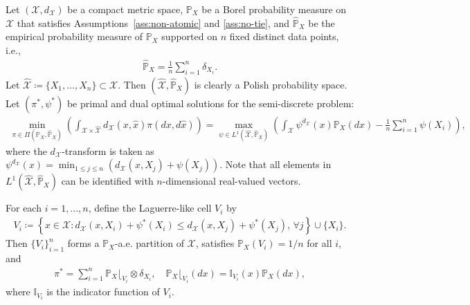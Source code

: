 \documentclass[10pt,a4paper]{amsart}
\begin{document}
\begin{lemma}
	\label{lem:laguerre}
	Let $(\mathcal{X},d_{\mathcal{X}})$ be a compact metric space, $\mathbb{P}_X$ be a Borel probability measure on $\mathcal{X}$ that satisfies Assumptions~\ref{ass:non-atomic} and \ref{ass:no-tie}, and $\hat{\mathbb{P}}_X$ be the empirical probability measure of $\mathbb{P}_X$ supported on $n$ fixed distinct data points, i.e.,
	\begin{align*}
		\hat{\mathbb{P}}_X = \frac{1}{n} \sum_{i=1}^{n} \delta_{X_i} .
	\end{align*}
	Let $\hat{\mathcal{X}} \coloneqq \{X_1,...,X_n\} \subset \mathcal{X}$. Then $(\hat{\mathcal{X}},\hat{\mathbb{P}}_X)$ is clearly a Polish probability space. Let $(\pi^*,\psi^*)$ be primal and dual optimal solutions for the semi-discrete problem:
	\begin{align*}
		\min_{\pi \in \Pi(\mathbb{P}_X,\hat{\mathbb{P}}_X)}\left(\int_{\mathcal{X} \times \hat{\mathcal{X}}} d_{\mathcal{X}}(x,\hat{x}) \pi(dx,d\hat{x})\right) = \max_{\psi \in L^1(\hat{\mathcal{X}},\hat{\mathbb{P}}_X)} \left( \int_{\mathcal{X}} \psi^{d_{\mathcal{X}}}(x) \mathbb{P}_X(dx) - \frac{1}{n}\sum_{i=1}^{n} \psi(X_i) \right) ,
	\end{align*}
	where the ${d_{\mathcal{X}}}$-transform is taken as $\psi^{d_{\mathcal{X}}}(x) = \min_{1 \le j \le n} (d_{\mathcal{X}}(x,X_j) + \psi(X_j))$. Note that all elements in $L^1(\hat{\mathcal{X}},\hat{\mathbb{P}}_X)$ can be identified with $n$-dimensional real-valued vectors.
	
	For each $i= 1,...,n$, define the Laguerre-like cell $V_i$ by
	\begin{align*}
		V_i \coloneqq \left\{x \in \mathcal{X} : d_{\mathcal{X}}(x,X_i) + \psi^*(X_i) \leq d_{\mathcal{X}}(x,X_j) + \psi^*(X_j) , \, \forall j\right\} \cup \{X_i\} .	
	\end{align*}
	Then $\{V_i\}_{i=1}^n$ forms a $\mathbb{P}_X$-a.e. partition of $\mathcal{X}$, satisfies $\mathbb{P}_X(V_i)=1/n$ for all $i$, and
	\begin{align*}
		\pi^* = \sum_{i=1}^{n} \mathbb{P}_X\lfloor_{V_i} \otimes \delta_{X_i} , \quad \mathbb{P}_X\lfloor_{V_i}(dx) = \mathbb{I}_{V_i}(x)\mathbb{P}_X(dx) ,
	\end{align*}
	where $\mathbb{I}_{V_i}$ is the indicator function of $V_i$.
\end{lemma}
\end{document}
